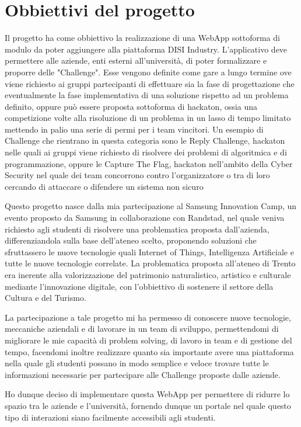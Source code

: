 \chapter{Obbiettivi del progetto}
\label{cha:intro}
Il progetto ha come obbiettivo la realizzazione di una WebApp sottoforma di modulo da poter aggiungere alla piattaforma DISI Industry. L'applicativo deve permettere alle aziende, enti esterni all'università, di poter formalizzare e proporre delle "Challenge". Esse vengono definite come gare a lungo termine ove viene richiesto ai gruppi partecipanti di effettuare sia la fase di progettazione che eventualmente la fase implementativa di una soluzione rispetto ad un problema definito, oppure può essere proposta sottoforma di hackaton, ossia una competizione volte alla risoluzione di un problema in un lasso di tempo limitato mettendo in palio una serie di permi per i team vincitori. Un esempio di Challenge che rientrano in questa categoria sono le Reply Challenge, hackaton nelle quali ai gruppi viene richiesto di risolvere dei problemi di algoritmica e di programmazione, oppure le Capture The Flag, hackaton nell'ambito della Cyber Security nel quale dei team concorrono contro l'organizzatore o tra di loro cercando di attaccare o difendere un sistema non sicuro

Questo progetto nasce dalla mia partecipazione al Samsung Innovation Camp, un evento proposto da Samsung in collaborazione con Randstad, nel quale veniva richiesto agli studenti di risolvere una problematica proposta dall'azienda, differenziandola sulla base dell'ateneo scelto, proponendo soluzioni che sfruttassero le nuove tecnologie quali Internet of Things, Intelligenza Artificiale e tutte le nuove tecnologie correlate. La problematica proposta all'ateneo di Trento era inerente alla valorizzazione del patrimonio naturalistico, artistico e culturale mediante l'innovazione digitale, con l'obbiettivo di sostenere il settore della Cultura e del Turismo.

La partecipazione a tale progetto mi ha permesso di conoscere nuove tecnologie, meccaniche aziendali e di lavorare in un team di sviluppo, permettendomi di migliorare le mie capacità di problem solving, di lavoro in team e di gestione del tempo, facendomi inoltre realizzare quanto sia importante avere una piattaforma nella quale gli studenti possano in modo semplice e veloce trovare tutte le informazioni necessarie per partecipare alle Challenge proposte dalle aziende.

Ho dunque deciso di implementare questa WebApp per permettere di ridurre lo spazio tra le aziende e l'università, fornendo dunque un portale nel quale questo tipo di interazioni siano facilmente accessibili agli studenti.



